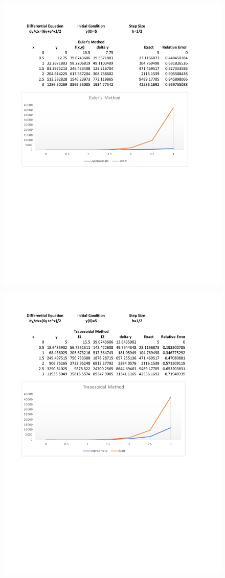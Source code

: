 \documentclass{article}
\begin{document}
\begin{figure}[h!]
\centering
\includegraphics[trim={0 11cm 0 0},clip,scale=0.5]{hw9_fig1}
\end{figure}

\begin{figure}[h!]
\centering
\includegraphics[trim={0 11cm 0 0},clip,scale=0.5]{hw9_fig2}
\end{figure}
\end{document}
